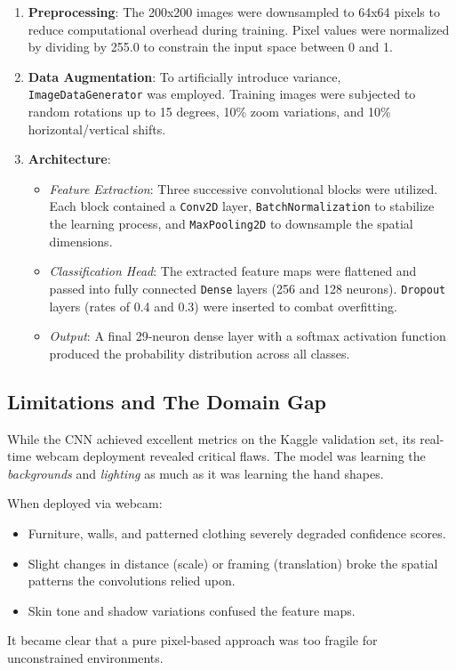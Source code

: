 \documentclass[12pt,a4paper]{article}
\begin{document}
\begin{enumerate}
    \item \textbf{Preprocessing}: The 200x200 images were downsampled to 64x64 pixels to reduce computational overhead during training. Pixel values were normalized by dividing by 255.0 to constrain the input space between 0 and 1.
    \item \textbf{Data Augmentation}: To artificially introduce variance, \texttt{ImageDataGenerator} was employed. Training images were subjected to random rotations up to 15 degrees, 10\% zoom variations, and 10\% horizontal/vertical shifts.
    \item \textbf{Architecture}: 
    \begin{itemize}
        \item \textit{Feature Extraction}: Three successive convolutional blocks were utilized. Each block contained a \texttt{Conv2D} layer, \texttt{BatchNormalization} to stabilize the learning process, and \texttt{MaxPooling2D} to downsample the spatial dimensions.
        \item \textit{Classification Head}: The extracted feature maps were flattened and passed into fully connected \texttt{Dense} layers (256 and 128 neurons). \texttt{Dropout} layers (rates of 0.4 and 0.3) were inserted to combat overfitting.
        \item \textit{Output}: A final 29-neuron dense layer with a softmax activation function produced the probability distribution across all classes.
    \end{itemize}
\end{enumerate}

\subsection{Limitations and The Domain Gap}
While the CNN achieved excellent metrics on the Kaggle validation set, its real-time webcam deployment revealed critical flaws. The model was learning the \textit{backgrounds} and \textit{lighting} as much as it was learning the hand shapes. 

When deployed via webcam:
\begin{itemize}
    \item Furniture, walls, and patterned clothing severely degraded confidence scores.
    \item Slight changes in distance (scale) or framing (translation) broke the spatial patterns the convolutions relied upon.
    \item Skin tone and shadow variations confused the feature maps.
\end{itemize}
It became clear that a pure pixel-based approach was too fragile for unconstrained environments.
\end{document}
